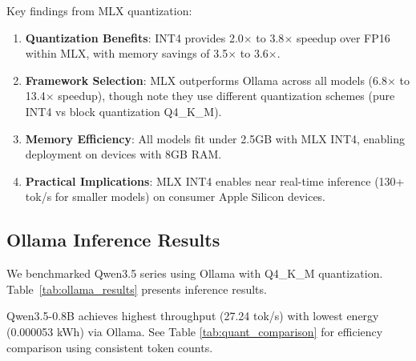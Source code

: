 \documentclass[conference]{IEEEtran}
\begin{document}
Key findings from MLX quantization:

\begin{enumerate}[leftmargin=*,nosep]
    \item \textbf{Quantization Benefits}: INT4 provides 2.0$\times$ to 3.8$\times$ speedup over FP16 within MLX, with memory savings of 3.5$\times$ to 3.6$\times$.

    \item \textbf{Framework Selection}: MLX outperforms Ollama across all models (6.8$\times$ to 13.4$\times$ speedup), though note they use different quantization schemes (pure INT4 vs block quantization Q4\_K\_M).

    \item \textbf{Memory Efficiency}: All models fit under 2.5GB with MLX INT4, enabling deployment on devices with 8GB RAM.

    \item \textbf{Practical Implications}: MLX INT4 enables near real-time inference (130+ tok/s for smaller models) on consumer Apple Silicon devices.
\end{enumerate}

\subsection{Ollama Inference Results}

We benchmarked Qwen3.5 series using Ollama with Q4\_K\_M quantization. Table~\ref{tab:ollama_results} presents inference results.

\begin{table}[t]
\centering
\caption{Ollama Q4\_K\_M inference results. Energy measured using CodeCarbon.}
\label{tab:ollama_results}
\end{table}

Qwen3.5-0.8B achieves highest throughput (27.24 tok/s) with lowest energy (0.000053 kWh) via Ollama. See Table \ref{tab:quant_comparison} for efficiency comparison using consistent token counts.
\end{document}

